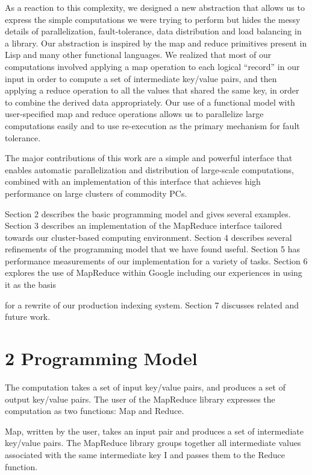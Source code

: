 \documentclass[
]{article}
\begin{document}
As a reaction to this complexity, we designed a new abstraction that
allows us to express the simple computations we were trying to perform
but hides the messy details of parallelization, fault-tolerance, data
distribution and load balancing in a library. Our abstraction is
inspired by the map and reduce primitives present in Lisp and many other
functional languages. We realized that most of our computations involved
applying a map operation to each logical ``record'' in our input in
order to compute a set of intermediate key/value pairs, and then
applying a reduce operation to all the values that shared the same key,
in order to combine the derived data appropriately. Our use of a
functional model with user-specified map and reduce operations allows us
to parallelize large computations easily and to use re-execution as the
primary mechanism for fault tolerance.

The major contributions of this work are a simple and powerful interface
that enables automatic parallelization and distribution of large-scale
computations, combined with an implementation of this interface that
achieves high performance on large clusters of commodity PCs.

Section 2 describes the basic programming model and gives several
examples. Section 3 describes an implementation of the MapReduce
interface tailored towards our cluster-based computing environment.
Section 4 describes several refinements of the programming model that we
have found useful. Section 5 has performance measurements of our
implementation for a variety of tasks. Section 6 explores the use of
MapReduce within Google including our experiences in using it as the
basis

for a rewrite of our production indexing system. Section 7 discusses
related and future work.

\section{2 Programming Model}\label{programming-model}

The computation takes a set of input key/value pairs, and produces a set
of output key/value pairs. The user of the MapReduce library expresses
the computation as two functions: Map and Reduce.

Map, written by the user, takes an input pair and produces a set of
intermediate key/value pairs. The MapReduce library groups together all
intermediate values associated with the same intermediate key I and
passes them to the Reduce function.
\end{document}
